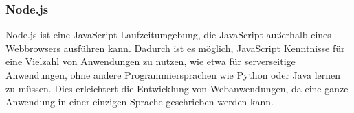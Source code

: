 \subsubsection{Node.js}

Node.js ist eine JavaScript Laufzeitumgebung, die JavaScript außerhalb eines Webbrowsers ausführen kann.
Dadurch ist es möglich, JavaScript Kenntnisse für eine Vielzahl von Anwendungen zu nutzen, wie etwa für serverseitige Anwendungen,
ohne andere Programmiersprachen wie Python oder Java lernen zu müssen.
Dies erleichtert die Entwicklung von Webanwendungen, da eine ganze Anwendung in einer einzigen Sprache geschrieben werden kann.
\cite{intro:nodejs}
